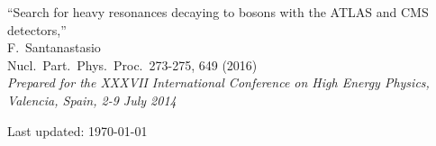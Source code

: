 \documentclass[10pt, a4paper]{article}
\begin{document}
\begin{thebibliography}{599}
``Search for heavy resonances decaying to bosons with the ATLAS and CMS detectors,'' 
 \\{}F.~Santanastasio 
 \\ Nucl.\ Part.\ Phys.\ Proc.\  273-275, 649 (2016)
  \\{}{\it Prepared for the XXXVII International Conference on High Energy Physics, Valencia, Spain, 2-9 July 2014}





\end{thebibliography}

\vfill{}
\hrulefill

\begin{center}
{\footnotesize Last updated: \today}
\end{center}
\end{document}
